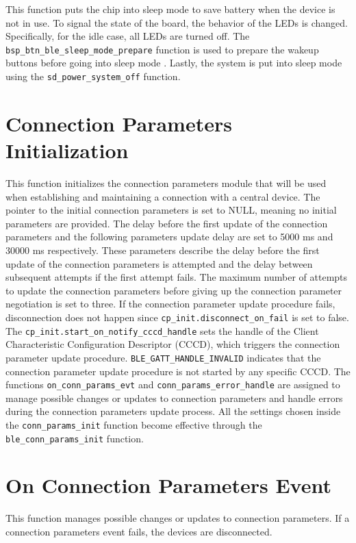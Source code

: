\documentclass{Configuration_Files/PoliMi3i_thesis}
\begin{document}
This function puts the chip into sleep mode to save battery when the device is not in use. To signal the state of the board, the behavior of the LEDs is changed. Specifically, for the idle case, all LEDs are turned off. The \texttt{bsp\_btn\_ble\_sleep\_mode\_prepare} function is used to prepare the wakeup buttons before going into sleep mode \cite{nordic_semi}. Lastly, the system is put into sleep mode using the \texttt{sd\_power\_system\_off} function.

\section*{Connection Parameters Initialization}

This function initializes the connection parameters module that will be used when establishing and maintaining a connection with a central device. The pointer to the initial connection parameters is set to NULL, meaning no initial parameters are provided. The delay before the first update of the connection parameters and the following parameters update delay are set to 5000 ms and 30000 ms respectively. These parameters describe the delay before the first update of the connection parameters is attempted and the delay between subsequent attempts if the first attempt fails. The maximum number of attempts to update the connection parameters before giving up the connection parameter negotiation is set to three. If the connection parameter update procedure fails, disconnection does not happen since \texttt{cp\_init.disconnect\_on\_fail} is set to false. The \texttt{cp\_init.start\_on\_notify\_cccd\_handle} sets the handle of the Client Characteristic Configuration Descriptor (CCCD), which triggers the connection parameter update procedure. \texttt{BLE\_GATT\_HANDLE\_INVALID} indicates that the connection parameter update procedure is not started by any specific CCCD. The functions \texttt{on\_conn\_params\_evt} and \texttt{conn\_params\_error\_handle} are assigned to manage possible changes or updates to connection parameters and handle errors during the connection parameters update process. All the settings chosen inside the \texttt{conn\_params\_init} function become effective through the \texttt{ble\_conn\_params\_init} function.

\section*{On Connection Parameters Event}

This function manages possible changes or updates to connection parameters. If a connection parameters event fails, the devices are disconnected.
\end{document}
